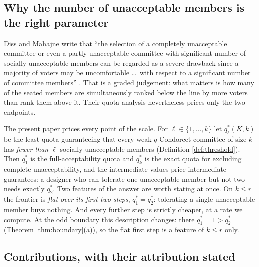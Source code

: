 \documentclass[11pt]{article}
\theoremstyle{plain}
\theoremstyle{definition}
\begin{document}
\subsection{Why the number of unacceptable members is the right parameter}
\label{sec:whyell}

Diss and Mahajne write that ``the selection of a completely unacceptable committee or even a partly unacceptable committee with significant number of socially unacceptable members can be regarded as a severe drawback since a majority of voters may be uncomfortable \dots\ with respect to a significant number of committee members'' \cite[p.~14]{DissMahajne2020}. That is a graded judgement: what matters is how many of the seated members are simultaneously ranked below the line by more voters than rank them above it. Their quota analysis nevertheless prices only the two endpoints.

The present paper prices every point of the scale. For $\ell\in\{1,\dots,k\}$ let $q_\ell^*(K,k)$ be the least quota guaranteeing that every weak $q$-Condorcet committee of size $k$ has \emph{fewer than $\ell$} socially unacceptable members (Definition \ref{def:threshold}). Then $q_1^*$ is the full-acceptability quota and $q_k^*$ is the exact quota for excluding complete unacceptability, and the intermediate values price intermediate guarantees: a designer who can tolerate one unacceptable member but not two needs exactly $q_2^*$. Two features of the answer are worth stating at once. On $k\le r$ the frontier is \emph{flat over its first two steps}, $q_1^*=q_2^*$: tolerating a single unacceptable member buys nothing. And every further step is strictly cheaper, at a rate we compute. At the odd boundary this description changes: there $q_1^*=1>q_2^*$ (Theorem \ref{thm:boundary}(a)), so the flat first step is a feature of $k\le r$ only.

\subsection{Contributions, with their attribution stated}
\label{sec:contrib}
\end{document}
